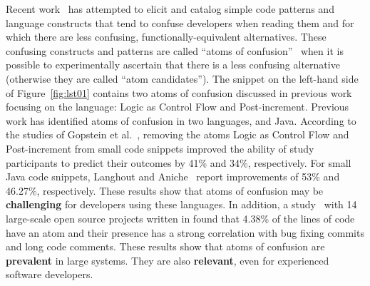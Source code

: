 Recent work~\cite{DBLP:journals/ese/MedeirosLAAKRG19,DBLP:conf/sigsoft/GopsteinIYDZYC17,Langhout:2021:ACJ,TheEyesDoNotLie} has attempted to elicit and catalog simple code patterns and language constructs that tend to confuse developers when reading them and for which there are less confusing, functionally-equivalent alternatives. These confusing constructs and patterns are called ``atoms of confusion''~\cite{DBLP:conf/sigsoft/GopsteinIYDZYC17} when it is possible to experimentally ascertain that there is a less confusing alternative (otherwise they are called ``atom candidates''). The snippet on the left-hand side of Figure~\ref{fig:lst01} contains two atoms of confusion discussed in previous work~\cite{DBLP:conf/sigsoft/GopsteinIYDZYC17} focusing on the \clang language: Logic as Control Flow and Post-increment. Previous work has identified atoms of confusion in two languages, \clang and Java. According to the studies of Gopstein et al.~\cite{DBLP:conf/sigsoft/GopsteinIYDZYC17}, removing the atoms Logic as Control Flow and Post-increment from small \clang code snippets improved the ability of study participants to predict their outcomes by 41\% and 34\%, respectively. For small Java code snippets, Langhout and Aniche~\cite{Langhout:2021:ACJ} report improvements of 53\% and 46.27\%, respectively. These results show that atoms of confusion may be \textbf{challenging} for developers using these languages. In addition, a study~\cite{DBLP:conf/msr/GopsteinZFC18} with 14 large-scale open source projects written in \clang found that 4.38\% of the lines of code have an atom and their presence has a strong correlation with bug fixing commits and long code comments. These results show that atoms of confusion are \textbf{prevalent} in large systems. They are also \textbf{relevant}, even for experienced software developers. 



